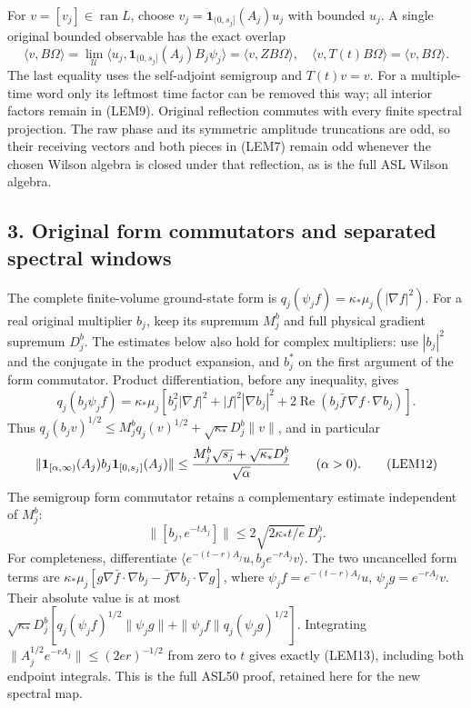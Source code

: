 \documentclass[11pt]{article}
\begin{document}
For \(v=[v_j]\in\operatorname{ran}L\), choose \(v_j=\mathbf1_{(0,s_j]}(A_j)u_j\) with bounded \(u_j\). A single original bounded observable has the exact overlap
\[
 \langle v,B\Omega\rangle
 =\lim_{\mathcal U}\langle u_j,\mathbf1_{(0,s_j]}(A_j)B_j\psi_j\rangle
 =\langle v,ZB\Omega\rangle,
 \quad
 \langle v,T(t)B\Omega\rangle=\langle v,B\Omega\rangle.
 \tag{LEM10}
\]
The last equality uses the self-adjoint semigroup and \(T(t)v=v\). For a multiple-time word only its leftmost time factor can be removed this way; all interior factors remain in (LEM9). Original reflection commutes with every finite spectral projection. The raw phase and its symmetric amplitude truncations are odd, so their receiving vectors and both pieces in (LEM7) remain odd whenever the chosen Wilson algebra is closed under that reflection, as is the full ASL Wilson algebra.

\subsection*{3. Original form commutators and separated spectral windows}

The complete finite-volume ground-state form is
\(q_j(\psi_jf)=\kappa_*\mu_j(|\nabla f|^2)\).
For a real original multiplier \(b_j\), keep its supremum \(M_j^{b}\) and full physical gradient supremum \(D_j^{b}\). The estimates below also hold for complex multipliers: use \(|b_j|^2\) and the conjugate in the product expansion, and \(b_j^*\) on the first argument of the form commutator. Product differentiation, before any inequality, gives
\[
 q_j(b_j\psi_jf)=\kappa_*\mu_j\left[
 b_j^2|\nabla f|^2+|f|^2|\nabla b_j|^2
 +2\operatorname{Re}(b_j\bar f\,\nabla f\cdot\nabla b_j)\right].
 \tag{LEM11}
\]
Thus \(q_j(b_jv)^{1/2}\le M_j^b q_j(v)^{1/2}+\sqrt{\kappa_*}D_j^b\|v\|\), and in particular
\[
 \|\mathbf1_{[\alpha,\infty)}(A_j)b_j\mathbf1_{[0,s_j]}(A_j)\|
 \le{M_j^b\sqrt{s_j}+\sqrt{\kappa_*}D_j^b\over\sqrt\alpha}
 \qquad(\alpha>0).
 \tag{LEM12}
\]
The semigroup form commutator retains a complementary estimate independent of \(M_j^b\):
\[
 \|[b_j,e^{-tA_j}]\|\le2\sqrt{2\kappa_*t/e}\,D_j^b.
 \tag{LEM13}
\]
For completeness, differentiate \(\langle e^{-(t-r)A_j}u,b_je^{-rA_j}v\rangle\). The two uncancelled form terms are \(\kappa_*\mu_j[g\nabla\bar f\cdot\nabla b_j-\bar f\nabla b_j\cdot\nabla g]\), where \(\psi_jf=e^{-(t-r)A_j}u\), \(\psi_jg=e^{-rA_j}v\). Their absolute value is at most \(\sqrt{\kappa_*}D_j^b[q_j(\psi_jf)^{1/2}\|\psi_jg\|+\|\psi_jf\|q_j(\psi_jg)^{1/2}]\). Integrating \(\|A_j^{1/2}e^{-rA_j}\|\le(2er)^{-1/2}\) from zero to \(t\) gives exactly (LEM13), including both endpoint integrals. This is the full ASL50 proof, retained here for the new spectral map.
\end{document}
